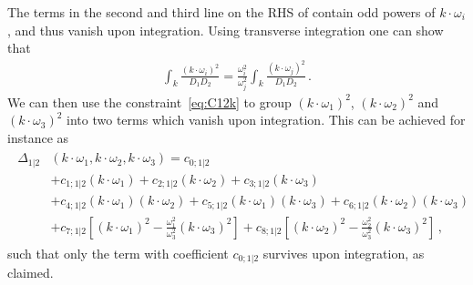 The terms in the second and third line on the RHS of  contain odd powers of $k\cdot \omega_i$, and thus vanish upon integration.
Using transverse integration one can show that
\begin{align}
\int_k \frac{(k \cdot \omega_i)^2}{D_1 D_2} = \frac{\omega_i^2}{\omega_j^2} \int_k \frac{(k \cdot \omega_j)^2}{D_1 D_2} \,.
\end{align}
We can then use the constraint~\eqref{eq:C12k} to group $(k\cdot \omega_1)^2$, $(k\cdot \omega_2)^2$ and $(k\cdot \omega_3)^2$ into two terms which vanish upon integration. This can be achieved for instance as
\begin{align}
\begin{aligned}
  \Delta_{1|2}&(k \cdot \omega_1, k \cdot \omega_2, k \cdot \omega_3) = c_{0;1|2} \\
 & + c_{1;1|2} (k \cdot \omega_1) 
  + c_{2;1|2} (k \cdot \omega_2) + c_{3;1|2} (k \cdot \omega_3)  \\
 & + c_{4;1|2} (k \cdot \omega_1) (k \cdot \omega_2) 
  + c_{5;1|2} (k \cdot \omega_1) (k \cdot \omega_3) 
  + c_{6;1|2} (k \cdot \omega_2) (k \cdot \omega_3) \\
  & + c_{7;1|2} \left[ (k \cdot \omega_1)^2  - \frac{\omega_1^2}{\omega_3^2} (k \cdot \omega_3)^2  \right]
  + c_{8;1|2} \left[ (k \cdot \omega_2)^2  - \frac{\omega_2^2}{\omega_3^2} (k \cdot \omega_3)^2  \right] \,,
\end{aligned}
\end{align}
such that only the term with coefficient $c_{0;1|2}$ survives upon integration, as claimed.

